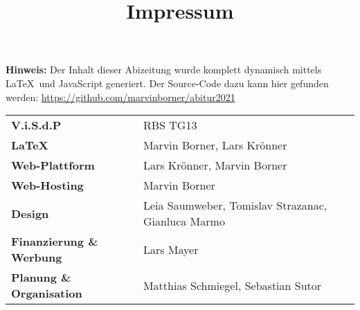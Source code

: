 \title{Impressum}


\textbf{Hinweis:} Der Inhalt dieser Abizeitung wurde komplett dynamisch mittels \LaTeX\  und JavaScript generiert. Der Source-Code dazu kann hier gefunden werden: \url{https://github.com/marvinborner/abitur2021}

\begin{center}
\end{center}

\begin{table}[b]
	\begin{tabular}{ l l }
		\textbf{V.i.S.d.P}               & RBS TG13                                           \\ %
		\textbf{\LaTeX}                  & Marvin Borner, Lars Krönner                        \\
		\textbf{Web-Plattform}           & Lars Krönner, Marvin Borner                        \\
		\textbf{Web-Hosting}             & Marvin Borner                                      \\
		\textbf{Design}                  & Leia Saumweber, Tomislav Strazanac, Gianluca Marmo \\
		\textbf{Finanzierung \& Werbung} & Lars Mayer                                         \\
		\textbf{Planung \& Organisation} & Matthias Schmiegel, Sebastian Sutor                \\
	\end{tabular}
\end{table}
